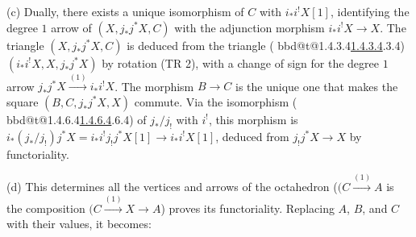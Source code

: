 \documentclass[12pt,oneside]{amsbook}
\makeatletter
\DeclareRobustCommand{\rn}[1]{%
  \ifcsname bbd@t@#1\endcsname\hyperlink{bbd:#1}{#1}\else#1\fi}
\theoremstyle{plain}
\theoremstyle{definition}
\makeatother
\begin{document}
(c) Dually, there exists a unique isomorphism of $C$ with $i_* i^! X[1]$, identifying the degree $1$ arrow of $(X, j_* j^* X, C)$ with the adjunction morphism $i_* i^! X \to X$. The triangle $(X, j_* j^* X, C)$ is deduced from the triangle (\rn{1.4.3.4}) $(i_* i^! X, X, j_* j^* X)$ by rotation (TR 2), with a change of sign for the degree $1$ arrow $j_* j^* X \overset{(1)}\to i_* i^! X$. The morphism $B \to C$ is the unique one that makes the square $(B, C, j_* j^* X, X)$ commute. Via the isomorphism (\rn{1.4.6.4}) of $j_*/j_!$ with $i^!$, this morphism is $i_* (j_*/j_!) j^* X = i_* i^! j_! j^* X[1] \to i_* i^! X[1]$, deduced from $j_! j^* X \to X$ by functoriality.

(d) This determines all the vertices and arrows of the octahedron ($(C \overset{(1)}\to A$ is the composition $(C \overset{(1)}\to X\to A$) proves its functoriality. Replacing $A$, $B$, and $C$ with their values, it becomes:

\begin{center}
\begin{minipage}{0.45\textwidth}
\centering
{}
\end{minipage}
\end{center}
\end{document}
